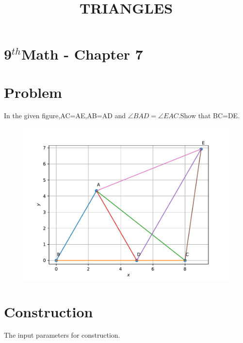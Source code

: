 \documentclass[10pt]{article}
\begin{document}
\begin{center}
\title{\textbf{TRIANGLES}}
\date{\vspace{-5ex}}
\maketitle
\end{center}
\section*{9$^{th}$Math - Chapter 7}
\section*{Problem}
In the given figure,AC=AE,AB=AD and $\angle BAD=\angle EAC$.Show that BC=DE.
\begin{figure}[!h]
	\begin{center}
	\includegraphics[width=5in]{./fig/fig.pdf}
	\end{center}
\caption{}
\label{figure}
\end{figure}
\section*{Construction}
The input parameters for construction.\\
\end{document}
